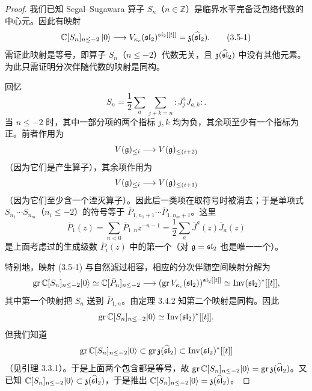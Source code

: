 \begin{proof}
    我们已知 Segal–Sugawara 算子 $S_n$（$n\in\mathbb{Z}$）是临界水平完备泛包络代数的中心元。因此有映射
    \begin{equation}
        \mathbb{C}[S_n]_{n\le -2}\,|0\rangle \longrightarrow V_{\kappa_c}(\mathfrak{sl}_2)^{\mathfrak{sl}_2[[t]]}=\mathfrak{z}(\widehat{\mathfrak{sl}}_2).
        \tag{3.5-1}
    \end{equation}
    需证此映射是等号，即算子 $S_n$（$n\le -2$）代数无关，且 $\mathfrak{z}(\widehat{\mathfrak{sl}}_2)$ 中没有其他元素。为此只需证明分次伴随代数的映射是同构。

    回忆
    \begin{equation}
        S_n=\frac12\sum_a\sum_{j+k=n}{:}J^a_j J_{a,k}{:}.
        \tag{3.5-2}
    \end{equation}
    当 $n\le -2$ 时，其中一部分项的两个指标 $j,k$ 均为负，其余项至少有一个指标为正。前者作用为
    \[
        V(\mathfrak{g})_{\le i}\longrightarrow V(\mathfrak{g})_{\le (i+2)}
    \]
    （因为它们是产生算子），其余项作用为
    \[
        V(\mathfrak{g})_{\le i}\longrightarrow V(\mathfrak{g})_{\le (i+1)}
    \]
    （因为它们至少含一个湮灭算子）。因此后一类项在取符号时被消去；于是单项式 $S_{n_1}\cdots S_{n_m}$（$n_i\le -2$）的符号等于 $\bar P_{1,n_1+1}\cdots\bar P_{1,n_m+1}$。这里
    \[
        \bar P_1(z)=\sum_{n<0}\bar P_{1,n}z^{-n-1}=\frac12\sum_a \bar J^a(z)\bar J_a(z)
    \]
    是上面考虑过的生成级数 $\bar P_i(z)$ 中的第一个（对 $\mathfrak{g}=\mathfrak{sl}_2$ 也是唯一一个）。

    特别地，映射 (3.5-1) 与自然滤过相容，相应的分次伴随空间映射分解为
    \[
        \operatorname{gr}\mathbb{C}[S_n]_{n\le-2}|0\rangle\simeq\mathbb{C}[\bar P_n]_{n\le-2}
        \longrightarrow(\operatorname{gr}V_{\kappa_c}(\mathfrak{sl}_2))^{\mathfrak{sl}_2[[t]]}
        \simeq\operatorname{Inv}(\mathfrak{sl}_2)^*[[t]],
    \]
    其中第一个映射把 $S_n$ 送到 $\bar P_{1,n}$。由定理 3.4.2 知第二个映射是同构。因此
    \[
        \operatorname{gr}\mathbb{C}[S_n]_{n\le-2}|0\rangle\simeq\operatorname{Inv}(\mathfrak{sl}_2)^*[[t]].
    \]
    但我们知道
    \[
        \operatorname{gr}\mathbb{C}[S_n]_{n\le-2}|0\rangle\subset\operatorname{gr}\mathfrak{z}(\widehat{\mathfrak{sl}}_2)
        \subset\operatorname{Inv}(\mathfrak{sl}_2)^*[[t]]
    \]
    （见引理 3.3.1）。于是上面两个包含都是等号，故 $\operatorname{gr}\mathbb{C}[S_n]_{n\le-2}|0\rangle=\operatorname{gr}\mathfrak{z}(\widehat{\mathfrak{sl}}_2)$。又已知 $\mathbb{C}[S_n]_{n\le-2}|0\rangle\subset\mathfrak{z}(\widehat{\mathfrak{sl}}_2)$，于是推出 $\mathbb{C}[S_n]_{n\le-2}|0\rangle=\mathfrak{z}(\widehat{\mathfrak{sl}}_2)$。
\end{proof}

